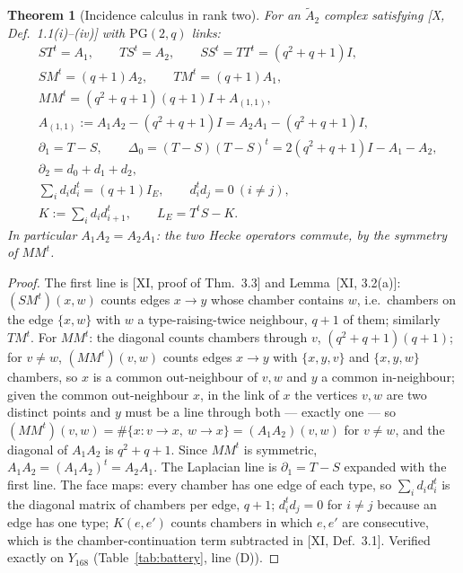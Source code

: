 \documentclass[11pt]{amsart}
\numberwithin{equation}{section}
\newtheorem{theorem}{Theorem}[section]
\theoremstyle{definition}
\theoremstyle{remark}
\newcommand{\PG}{\mathrm{PG}}
\newcommand{\Atwo}{\widetilde A_2}
\newcommand{\LE}{L_{E}}
\begin{document}
\begin{theorem}[Incidence calculus in rank two]\label{thm:calculus}
For an $\Atwo$ complex satisfying {\rm[X, Def.~1.1(i)--(iv)]} with $\PG(2,q)$ links:
\begin{align*}
&ST^{t}=A_1,\qquad TS^{t}=A_2,\qquad SS^{t}=TT^{t}=(q^{2}+q+1)I,\\
&SM^{t}=(q+1)A_2,\qquad TM^{t}=(q+1)A_1,\\
&MM^{t}=(q^{2}+q+1)(q+1)I+A_{(1,1)},\\
&A_{(1,1)}:=A_1A_2-(q^{2}+q+1)I=A_2A_1-(q^{2}+q+1)I,\\
&\partial_1=T-S,\qquad \Delta_0=(T-S)(T-S)^{t}=2(q^{2}+q+1)I-A_1-A_2,\\
&\partial_2=d_0+d_1+d_2,\\
&\textstyle\sum_id_id_i^{t}=(q+1)I_E,\qquad d_i^{t}d_j=0\ (i\ne j),\\
&\textstyle K:=\sum_id_id_{i+1}^{t},\qquad \LE=T^{t}S-K .
\end{align*}
In particular $A_1A_2=A_2A_1$: the two Hecke operators commute, by the symmetry of $MM^{t}$.
\end{theorem}

\begin{proof}
The first line is [XI, proof of Thm.~3.3] and Lemma~[XI, 3.2(a)]: $(SM^{t})(x,w)$ counts
edges $x\to y$ whose chamber contains $w$, i.e.\ chambers on the edge $\{x,w\}$ with $w$ a
type-raising-twice neighbour, $q+1$ of them; similarly $TM^{t}$. For $MM^{t}$: the diagonal
counts chambers through $v$, $(q^{2}+q+1)(q+1)$; for $v\ne w$, $(MM^{t})(v,w)$ counts edges
$x\to y$ with $\{x,y,v\}$ and $\{x,y,w\}$ chambers, so $x$ is a common out-neighbour of $v,w$
and $y$ a common in-neighbour; given the common out-neighbour $x$, in the link of $x$ the
vertices $v,w$ are two distinct points and $y$ must be a line through both --- exactly one
--- so $(MM^{t})(v,w)=\#\{x\colon v\to x,\ w\to x\}=(A_1A_2)(v,w)$ for $v\ne w$, and the
diagonal of $A_1A_2$ is $q^{2}+q+1$. Since $MM^{t}$ is symmetric, $A_1A_2=(A_1A_2)^{t}=A_2A_1$.
The Laplacian line is $\partial_1=T-S$ expanded with the first line. The face maps: every
chamber has one edge of each type, so $\sum_id_id_i^{t}$ is the diagonal matrix of chambers
per edge, $q+1$; $d_i^{t}d_j=0$ for $i\ne j$ because an edge has one type; $K(e,e')$ counts
chambers in which $e,e'$ are consecutive, which is the chamber-continuation term subtracted
in [XI, Def.~3.1]. Verified exactly on $Y_{168}$ (Table~\ref{tab:battery}, line (D)).
\end{proof}
\end{document}

